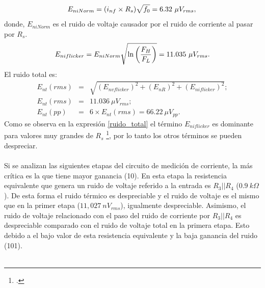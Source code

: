 \begin{equation}
    E_{niNorm}=(i_{nf}\times R_s)\sqrt{f_0}=6.32~\mu V_{rms}, \\
\end{equation}
donde, $E_{niNorm}$ es el ruido de voltaje causador por el ruido de corriente al pasar por $R_s$. 
\begin{equation}
    E_{niflicker}=E_{niNorm}\sqrt{\ln\left(\frac{F_H}{F_L}\right)}=11.035~\mu V_{rms}.\\
\end{equation}
El ruido total es:
\begin{eqnarray}
    E_{nt}(rms)&=&\sqrt{(E_{nvflicker})^2+(E_{nR})^2+(E_{niflicker})^2};\\
    \label{ruido_total}
     E_{nt}(rms)&=& 11.036~\mu V_{rms};\\
     E_{nt}(pp)&=& 6\times E_{nt}(rms)= 66.22~\mu V_{pp}.
\end{eqnarray}
Como se observa en la expresión \ref{ruido_total} el término $E_{niflicker}$ es dominante para valores muy grandes de $R_s$ \footcite{noise_source}, por lo tanto los otros términos se pueden despreciar.\\ \\
Si se analizan las siguientes etapas del circuito de medición de corriente, la más crítica es la que tiene mayor ganancia (10). En esta etapa la resistencia equivalente que genera un ruido de voltaje referido  a la entrada es $R_3||R_4$ ($0.9~k\Omega$). De esta forma el ruido térmico es despreciable y el ruido de voltaje es el mismo que en la primer etapa  ($11,027~nV_{rms}$), igualmente despreciable. Asimismo, el ruido de voltaje relacionado con el paso del ruido de corriente por $R_3||R_4$ es despreciable comparado con el ruido de voltaje total en la primera etapa. Esto debido a el bajo valor de esta resistencia equivalente y la baja ganancia del ruido (101).\\\\
